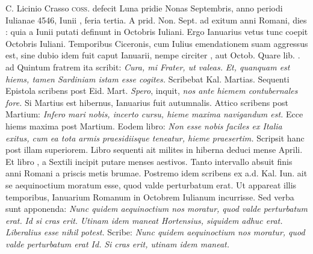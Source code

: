 C. Licinio Crasso
 \textsc{coss.} defecit
Luna pridie Nonas Septembris, anno periodi Iulianae 4546, Iunii
, feria tertia.
A prid. Non. Sept. %
 ad exitum anni Romani, dies
: quia a  Iunii putati definunt in 
 Octobris Iuliani.
Ergo
Ianuarius vetus tunc coepit  Octobris Iuliani.
Temporibus
Ciceronis, cum Iulius emendationem suam aggressus est, sine dubio
idem fuit caput Ianuarii, nempe circiter , aut 
 Octob. %
Quare lib. %
 . ad Quintum fratrem ita scribit: \textit{Cura, mi Frater, ut valeas.}
\textit{Et, quanquam est hiems, tamen Sardiniam istam esse cogites.}
Scribebat
 Kal. Martias. %
Sequenti Epistola scribens post  Eid. Mart. %
 \textit{Spero},
inquit, \textit{nos ante hiemem contubernales fore.}
Si Martius est hibernus,
Ianuarius fuit autumnalis.
Attico scribens post Martium: \textit{Infero mari
nobis, incerto cursu, hieme maxima navigandum est.}
Ecce hiems
maxima post Martium.
Eodem libro: \textit{Non esse nobis faciles ex Italia
exitus, cum ea tota armis praesidiisque teneatur, hieme praesertim.}
Scripsit
hanc post illam superiorem.
Libro sequenti ait milites in hiberna
deduci mense Aprili.
Et libro , a Sextili incipit putare menses aestivos.
Tanto intervallo absuit finis anni Romani a priscis metis brumae.
Postremo idem scribens ex a.d.  Kal. Iun. %
 ait se aequinoctium
moratum esse, quod valde perturbatum erat.
Ut appareat illis
temporibus, Ianuarium Romanum in Octobrem Iulianum incurrisse.
Sed verba sunt apponenda: \textit{Nunc quidem aequinoctium nos
moratur, quod valde perturbatum erat.}
\textit{Id si cras erit.}
\textit{Utinam idem
maneat Hortensius, siquidem adhuc erat.}
\textit{Liberalius esse nihil potest.}
%
Scribe: \textit{Nunc quidem aequinoctium nos moratur,
 quod valde perturbatum
erat Id.}
\textit{Si cras erit, utinam idem maneat.}
